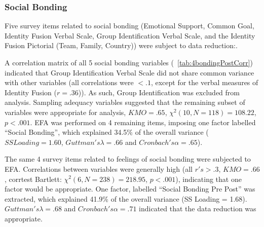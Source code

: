 \begin{CJK}{UTF8}{gbsn}



\subsubsection{Social Bonding}
Five survey items related to social bonding (Emotional Support, Common Goal, Identity Fusion Verbal Scale, Group Identification Verbal Scale, and the Identity Fusion Pictorial (Team, Family, Country)) were subject to data reduction:.

A correlation matrix of all 5 social bonding variables (~\ref{tab:4bondingPostCorr}) indicated that Group Identification Verbal Scale did not share common variance with other variables (all correlations were $<.1$, except for the verbal measures of Identity Fusion ($r =.36$)). As such, Group Identification was excluded from analysis.  Sampling adequacy variables suggested that the remaining subset of variables were appropriate for analysis, $KMO = .65$, $\chi^2(10, N = 118) = 108.22$, $p < .001$.  EFA was performed on 4 remaining items, imposing one factor labelled ``Social Bonding'', which explained 34.5\% of the overall variance ($SS Loading = 1.60$, $Guttman's \lambda =.66$ and $Cronbach's \alpha = .65$).

The same 4 survey items related to feelings of social bonding were subjected to EFA.  Correlations between variables were generally high (all $r's > .3$, $KMO = .66$, corrtest Bartlett: $\chi^2(6, N = 238) = 218.95$, $p < .001$), indicating that one factor would be appropriate.  One factor, labelled ``Social Bonding Pre Post'' was extracted, which explained 41.9\% of the overall variance (SS Loading = 1.68).  $Guttman's \lambda =.68$ and $Cronbach's \alpha = .71$ indicated that the data reduction was appropriate.


\end{CJK}
